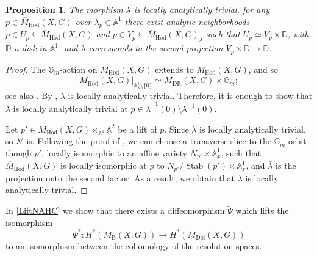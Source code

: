 \documentclass[JEP,XML,SOM,Unicode, NoEqCountersInSection,NoFloatCountersInSection,published]{cedram}
\newtheorem{prop}[thm]{Proposition}
\theoremstyle{definition}
\newcommand{\Aff}{\mathbb{A}}
\newcommand{\Gm}{\mathbb{G}_m}
\newcommand{\MDolG}{{M}_{\mathrm{Dol}}(X,G)}
\newcommand{\MBG}{{M}_{\mathrm{B}}(X,G)}
\newcommand{\MHodG}{{M}_{\mathrm{Hod}}(X,G)}
\newcommand{\bMHodG}{\overline{M}_{\mathrm{Hod}}(X,G)}
\newcommand{\bMDRG}{\overline{M}_{\mathrm{DR}}(X,G)}
\begin{document}
\begin{prop}\label{blambdaloctriv}
The morphism $\bar{\lambda}$ is locally analytically trivial, \ie for any $p \in \bMHodG$ over $\lambda_p \in \Aff^1$ there exist analytic neighborhoods $p \in U_p \subseteq \bMHodG$ and $p \in V_p \subseteq \bMHodG_{\lambda}$ such that $U_p\simeq V_p \times \mathbb{D}$, with $\mathbb{D}$ a disk in $\Aff^1$, and $\lambda$ corresponds to the second projection $V_p \times \mathbb{D} \to \mathbb{D}$.
\end{prop}
\begin{proof}
The $\Gm$\nobreakdash-action on $\MHodG$ extends to $\bMHodG$, and so
\[
\bMHodG|_{\Aff^1_\lambda \setminus \{0\}} \simeq \bMDRG \times \Gm;
\]
see also \cite[p.\,232]{Simpson1997}. By \cite[Th.\,9.1]{Simpson1997}, $\lambda$ is locally analytically trivial. Therefore, it is enough to show that $\bar{\lambda}$ is locally analytically trivial at $p \in \bar{\lambda}^{-1}(0) \setminus {\lambda}^{-1}(0)$.

Let $p' \in \MHodG \times_{\Aff^1}\Aff^2$ be a lift of $p$. Since $\lambda$ is locally analytically trivial, so $\lambda'$ is. Following the proof of \cite[Lem.\,3.5.1]{deCataldo2020}, we can choose a transverse slice to the $\Gm$\nobreakdash-orbit though $p'$, locally isomorphic to an affine variety $N_{p'} \times \Aff^1_x$, such that $\bMHodG$ is locally isomorphic at $p$ to $N_{p'}/\operatorname{Stab}(p') \times \Aff^1_x$, and $\bar{\lambda}$ is the projection onto the second factor. As a result, we obtain that $\bar{\lambda}$ is locally analytically trivial.
\end{proof}

In \cref{LiftNAHC} we show that there exists a diffeomorphism $\widetilde{\Psi}$ which lifts the isomorphism
\[
\Psi^*\colon H^*(\MBG) \to H^*(\MDolG)
\]
to an isomorphism between the cohomology of the resolution spaces.
\end{document}
